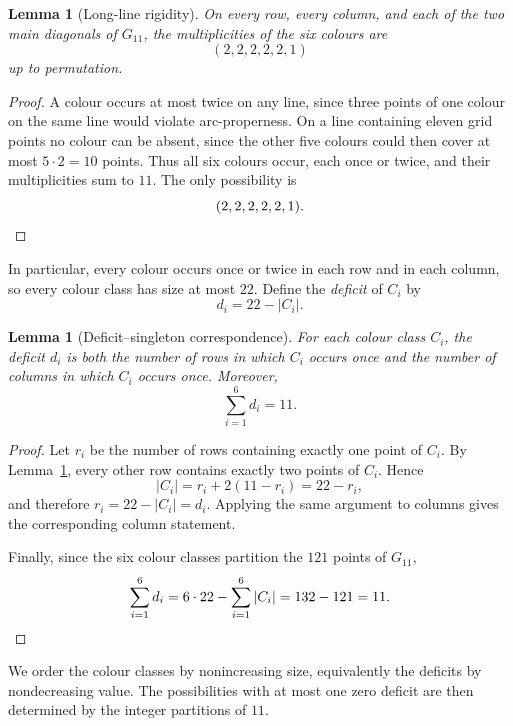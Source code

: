 \documentclass[11pt]{article}
\newtheorem{lemma}[theorem]{Lemma}
\theoremstyle{definition}
\theoremstyle{remark}
\begin{document}
\begin{lemma}[Long-line rigidity]\label{lem:g11-long-lines}
On every row, every column, and each of the two main diagonals of \(G_{11}\),
the multiplicities of the six colours are
\[
  (2,2,2,2,2,1)
\]
up to permutation.
\end{lemma}

\begin{proof}
A colour occurs at most twice on any line, since three points of one colour
on the same line would violate arc-properness.  On a line containing eleven
grid points no colour can be absent, since the other five colours could then
cover at most \(5\cdot2=10\) points.  Thus all six colours occur, each once
or twice, and their multiplicities sum to \(11\).  The only possibility is
\[
  (2,2,2,2,2,1).\qedhere
\]
\end{proof}

In particular, every colour occurs once or twice in each row and in each
column, so every colour class has size at most \(22\).  Define the
\emph{deficit} of \(C_i\) by
\[
  d_i=22-|C_i|.
\]

\begin{lemma}[Deficit--singleton correspondence]\label{lem:g11-deficits}
For each colour class \(C_i\), the deficit \(d_i\) is both the number of rows
in which \(C_i\) occurs once and the number of columns in which \(C_i\)
occurs once.  Moreover,
\[
  \sum_{i=1}^{6} d_i=11.
\]
\end{lemma}

\begin{proof}
Let \(r_i\) be the number of rows containing exactly one point of \(C_i\).
By Lemma~\ref{lem:g11-long-lines}, every other row contains exactly two
points of \(C_i\).  Hence
\[
  |C_i|=r_i+2(11-r_i)=22-r_i,
\]
and therefore \(r_i=22-|C_i|=d_i\).  Applying the same argument to columns
gives the corresponding column statement.

Finally, since the six colour classes partition the \(121\) points of
\(G_{11}\),
\[
  \sum_{i=1}^{6}d_i
  =6\cdot22-\sum_{i=1}^{6}|C_i|
  =132-121
  =11.\qedhere
\]
\end{proof}

We order the colour classes by nonincreasing size, equivalently the deficits
by nondecreasing value.  The possibilities with at most one zero deficit
are then determined by the integer partitions of \(11\).
\end{document}
